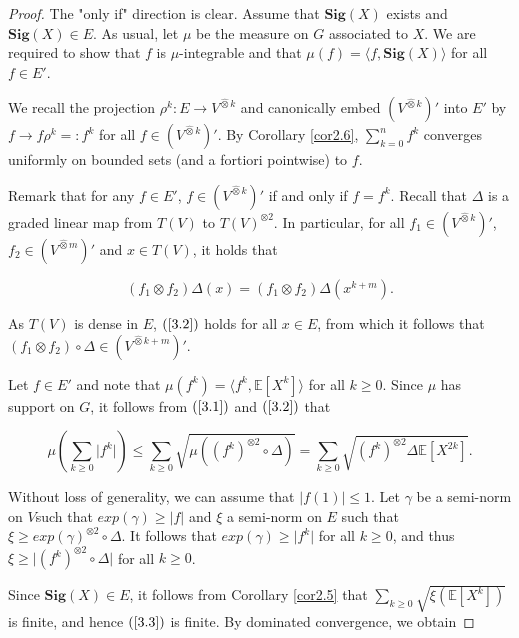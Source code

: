 \documentclass[12pt,a4paper]{report}
\theoremstyle{definition}
\begin{document}
\begin{proof}\parencite[see][Prop. 3.2]{chevyrev2016characteristic}
The "only if" direction is clear. Assume that $\textbf{Sig}(X)$ exists and $\textbf{Sig}(X) \in E$. As usual, let $\mu$ be the measure on $G$ associated to $X$. We are required to show that $f$ is $\mu$-integrable and that $\mu(f) = \langle f,\textbf{Sig}(X)\rangle$ for all $f \in E'$.

We recall the projection $\rho ^k: E \rightarrow V^{\hat{\otimes} k}$ and canonically embed $(V^{\hat{\otimes} k})' $ into $E'$ by $f \rightarrow f \rho^k =: f^k$ for all $f \in (V^{\hat{\otimes} k})'$. By Corollary \ref{cor2.6}, $\sum_{k=0}^{n} f^k$ converges uniformly on bounded sets (and a fortiori pointwise) to $f$.

Remark that for any $f \in E'$, $f \in (V^{\hat{\otimes} k})'$ if and only if $f = f^k$. Recall that $\Delta$ is a graded linear map from $T (V )$ to $T (V )^{\otimes 2}$. In particular, for all $f_1 \in (V^{\hat{\otimes} k})'$, $f_2 \in (V^{\hat{\otimes} m})'$ and $x \in T (V )$, it holds that

\begin{equation} \label{3.2}
	(f_1\otimes f_2)\Delta(x)=(f_1\otimes f_2)\Delta(x^{k+m}).
\end{equation}

As $T (V )$ is dense in $E$, $(\ref{3.2})$ holds for all $x \in E$, from which it follows that $(f_1\otimes f_2)\circ\Delta \in (V^{\hat{\otimes} k+m})'$.

Let $f \in E'$ and note that $\mu(f^k) =\langle f^k,\mathbb{E} [X^k]\rangle $ for all $k \geq 0$. Since $\mu $ has support on $G$, it follows from $(\ref{3.1})$ and $(\ref{3.2})$ that

\begin{equation} \label{3.3}
	\mu \left( \sum_{k\geq 0} \lvert f^k\rvert\right) \leq\sum_{k\geq 0}\sqrt{\mu ((f^k)^{\otimes 2}\circ\Delta)}=\sum_{k\geq 0}\sqrt{(f^k)^{\otimes 2}\Delta \mathbb{E}[X^{2k}]}.
\end{equation}

Without loss of generality, we can assume that $\lvert f(1)\rvert \leq 1$. Let $\gamma$ be a semi-norm on $V $such that $exp(\gamma) \geq \lvert f\rvert$ and $\xi$ a semi-norm on $E$ such that $\xi \geq exp(\gamma)^{\otimes 2} \circ \Delta$. It follows that $exp(\gamma) \geq \lvert f^k \rvert$ for all $k \geq 0$, and thus $\xi \geq \lvert(f^k )^{\otimes2} \circ \Delta \rvert$ for all $k \geq 0$.

Since $\textbf{Sig}(X) \in E$, it follows from Corollary \ref{cor2.5} that $\sum_{k\geq0}\sqrt{\xi (\mathbb{E}[X^k])}$ is finite, and hence $(\ref{3.3})$ is finite. By dominated convergence, we obtain


\end{proof}
\end{document}
